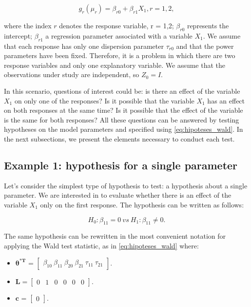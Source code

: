 \documentclass[Review,sagev,times, doublespace]{sagej}
\begin{document}
\begin{equation}
\label{eq:pred_ex}
g_r(\mu_r) = \beta_{r0} + \beta_{r1} X_1, r=1,2,
\end{equation}

\noindent where the index $r$ denotes the response variable, r = 1,2; $\beta_{r0}$ represents the intercept; $\beta_{r1}$ a regression parameter associated with a variable $X_1$. We assume that each response has only one dispersion parameter $\tau_{r0}$ and that the power parameters have been fixed. Therefore, it is a problem in which there are two response variables and only one explanatory variable. We assume that the observations under study are independent, so $Z_0 = I$. 

In this scenario, questions of interest could be: is there an effect of the variable $X_1$ on only one of the responses? Is it possible that the variable $X_1$ has an effect on both responses at the same time? Is it possible that the effect of the variable is the same for both responses? All these questions can be answered by testing hypotheses on the model parameters and specified using \autoref{eq:hipoteses_wald}. In the next subsections, we present the elements necessary to conduct each test.

\subsection{Example 1: hypothesis for a single parameter}

Let's consider the simplest type of hypothesis to test: a hypothesis about a single parameter. We are interested in to evaluate whether there is an effect of the variable $X_1$ only on the first response. The hypothesis can be written as follows:

\begin{equation}
\label{eq:ex1}
H_0: \beta_{11} = 0 \ vs \ H_1: \beta_{11} \neq 0.
\end{equation}

The same hypothesis can be rewritten in the most convenient notation for applying the Wald test statistic, as in \autoref{eq:hipoteses_wald} where:

\begin{itemize}
  
  \item $\boldsymbol{\theta^{*T}}$ = $\begin{bmatrix} \beta_{10} \  \beta_{11} \ \beta_{20} \ \beta_{21} \ \tau_{11} \ \tau_{21} \end{bmatrix}$.

\item $\boldsymbol{L} = \begin{bmatrix} 0 & 1 & 0 & 0 & 0 & 0  \end{bmatrix}.$
 
\item $\boldsymbol{c}$ = $\begin{bmatrix} 0 \end{bmatrix}.$

\end{itemize}
\end{document}

